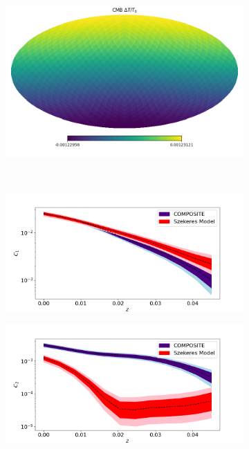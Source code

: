 \documentclass[a4paper,12pt]{report}
\begin{document}
\begin{figure}
    \centering
    \begin{subfigure}[b]{105mm}
        \centering
        \includegraphics[width=\textwidth]{BNW Model MCMC/0.5 Quantile/CMB.png}
        \caption{}
    \end{subfigure}
    \\
    \begin{subfigure}[b]{105mm}
        \centering
        \includegraphics[width=\textwidth]{BNW Model MCMC/0.5 Quantile/Hub C1.png}
        \caption{}
    \end{subfigure}
    \hfill
    \begin{subfigure}[b]{105mm}
        \centering
        \includegraphics[width=\textwidth]{BNW Model MCMC/0.5 Quantile/Hub C2.png}

\end{subfigure}
\end{figure}
\end{document}
